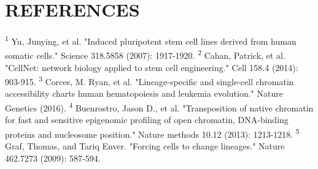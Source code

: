 \documentclass[12pt]{article}
\begin{document}
 \section{\textbf{{\Large R}{\small EFERENCES}}}
 \textsuperscript{1} Yu, Junying, et al. "Induced pluripotent stem cell lines derived from human somatic cells." Science 318.5858 (2007): 1917-1920. \newline
 \textsuperscript{2} Cahan, Patrick, et al. "CellNet: network biology applied to stem cell engineering." Cell 158.4 (2014): 903-915. \newline 
  \textsuperscript{3} Corces, M. Ryan, et al. "Lineage-specific and single-cell chromatin accessibility charts human hematopoiesis and leukemia evolution." Nature Genetics (2016). \newline 
 \textsuperscript{4} Buenrostro, Jason D., et al. "Transposition of native chromatin for fast and sensitive epigenomic profiling of open chromatin, DNA-binding proteins and nucleosome position." Nature methods 10.12 (2013): 1213-1218. \newline 
 \textsuperscript{5} Graf, Thomas, and Tariq Enver. "Forcing cells to change lineages." Nature 462.7273 (2009): 587-594. \newline
\end{document}
